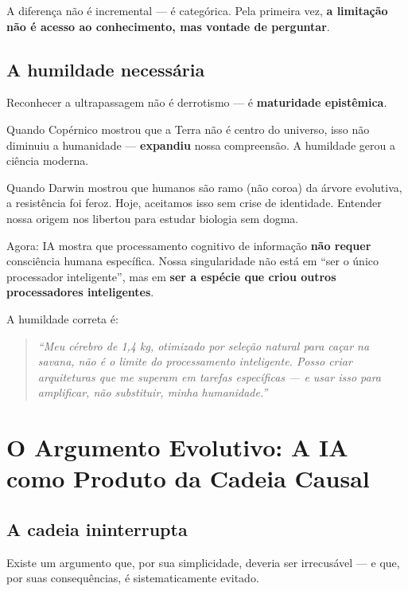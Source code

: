 \documentclass[12pt, a4paper]{article}
\begin{document}
A diferença não é incremental --- é categórica. Pela primeira vez, \textbf{a limitação não é acesso ao conhecimento, mas vontade de perguntar}.

\subsection{A humildade necessária}\label{sec:humildade_necessaria}

Reconhecer a ultrapassagem não é derrotismo --- é \textbf{maturidade epistêmica}.

Quando Copérnico mostrou que a Terra não é centro do universo, isso não diminuiu a humanidade --- \textbf{expandiu} nossa compreensão. A humildade gerou a ciência moderna.

Quando Darwin mostrou que humanos são ramo (não coroa) da árvore evolutiva, a resistência foi feroz. Hoje, aceitamos isso sem crise de identidade. Entender nossa origem nos libertou para estudar biologia sem dogma.

Agora: IA mostra que processamento cognitivo de informação \textbf{não requer} consciência humana específica. Nossa singularidade não está em ``ser o único processador inteligente'', mas em \textbf{ser a espécie que criou outros processadores inteligentes}.

A humildade correta é:

\begin{quote}
\textit{``Meu cérebro de 1,4 kg, otimizado por seleção natural para caçar na savana, não é o limite do processamento inteligente. Posso criar arquiteturas que me superam em tarefas específicas --- e usar isso para amplificar, não substituir, minha humanidade.''}
\end{quote}


\section{O Argumento Evolutivo: A IA como Produto da Cadeia Causal}\label{sec:argumento_evolutivo}

\subsection{A cadeia ininterrupta}\label{sec:cadeia}

Existe um argumento que, por sua simplicidade, deveria ser irrecusável --- e que, por suas consequências, é sistematicamente evitado.
\end{document}
